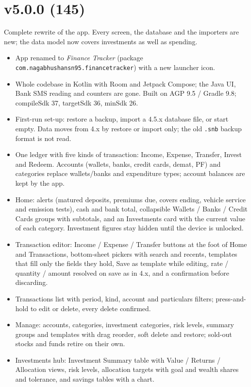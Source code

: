 \documentclass{article}
\begin{document}
    \section{v5.0.0 (145)}\label{sec:145}
    Complete rewrite of the app. Every screen, the database and the importers are new; the data model now covers investments as well as spending.
    \begin{itemize}
        \item App renamed to \textit{Finance Tracker} (package \texttt{com.nagabhushansn95.financetracker}) with a new launcher icon.
        \item Whole codebase in Kotlin with Room and Jetpack Compose; the Java UI, Bank SMS reading and counters are gone.
        Built on AGP 9.5 / Gradle 9.8; compileSdk 37, targetSdk 36, minSdk 26.
        \item First-run set-up: restore a backup, import a 4.5.x database file, or start empty.
        Data moves from 4.x by restore or import only; the old \texttt{.snb} backup format is not read.
        \item One ledger with five kinds of transaction: Income, Expense, Transfer, Invest and Redeem.
        Accounts (wallets, banks, credit cards, demat, PF) and categories replace wallets/banks and expenditure types; account balances are kept by the app.
        \item Home: alerts (matured deposits, premiums due, covers ending, vehicle service and emission tests), cash and bank total, collapsible Wallets / Banks / Credit Cards groups with subtotals, and an Investments card with the current value of each category.
        Investment figures stay hidden until the device is unlocked.
        \item Transaction editor: Income / Expense / Transfer buttons at the foot of Home and Transactions, bottom-sheet pickers with search and recents, templates that fill only the fields they hold, Save as template while editing, rate / quantity / amount resolved on save as in 4.x, and a confirmation before discarding.
        \item Transactions list with period, kind, account and particulars filters; press-and-hold to edit or delete, every delete confirmed.
        \item Manage: accounts, categories, investment categories, risk levels, summary groups and templates with drag reorder, soft delete and restore; sold-out stocks and funds retire on their own.
        \item Investments hub: Investment Summary table with Value / Returns / Allocation views, risk levels, allocation targets with goal and wealth shares and tolerance, and savings tables with a chart.

\end{itemize}
\end{document}
